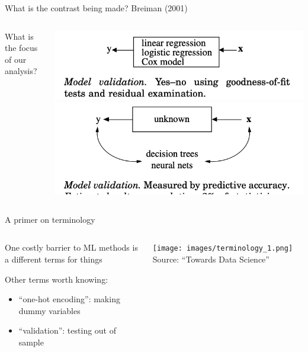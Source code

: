 \documentclass[notes,11pt, aspectratio=169]{beamer}
\newenvironment{wideitemize}{\itemize\addtolength{\itemsep}{10pt}}{\enditemize}
\begin{document}
\begin{frame}{What is the contrast being made? Breiman (2001)}
    \begin{columns}[onlytextwidth, T] %
      \begin{column}{.5\textwidth}
        \begin{wideitemize}
          \item What is the focus of our analysis?
        \end{wideitemize}
      \end{column}%
      \hfill%
      \begin{column}{.5\textwidth}
        \includegraphics[width=\linewidth]{images/breiman_box1.png}
        \includegraphics[width=\linewidth]{images/breiman_box2.png}        
      \end{column}%
    \end{columns}
\end{frame}


\begin{frame}{A primer on terminology}
    \begin{columns}[onlytextwidth, T] %
      \begin{column}{.5\textwidth}
        \begin{wideitemize}
        \item One costly barrier to ML methods is a different terms for things
        \item Other terms worth knowing:
          \begin{itemize}
          \item ``one-hot encoding'': making dummy variables
          \item ``validation'': testing out of sample
          \end{itemize}
        \end{wideitemize}
      \end{column}%
      \hfill%
      \begin{column}{.5\textwidth}
        \texttt{[image: images/terminology\_1.png]}
        Source: ``Towards Data Science''
      \end{column}%
    \end{columns}
\end{frame}
\end{document}
